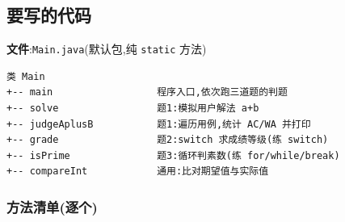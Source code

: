 \documentclass[
  11pt,
]{ctexart}
\begin{document}
\hypertarget{ux8981ux5199ux7684ux4ee3ux7801-1}{%
\subsection{要写的代码}\label{ux8981ux5199ux7684ux4ee3ux7801-1}}

\textbf{文件}:\texttt{Main.java}(默认包,纯 \texttt{static} 方法)

\begin{verbatim}
类 Main
+-- main                  程序入口,依次跑三道题的判题
+-- solve                 题1:模拟用户解法 a+b
+-- judgeAplusB           题1:遍历用例,统计 AC/WA 并打印
+-- grade                 题2:switch 求成绩等级(练 switch)
+-- isPrime               题3:循环判素数(练 for/while/break)
+-- compareInt            通用:比对期望值与实际值
\end{verbatim}

\hypertarget{ux65b9ux6cd5ux6e05ux5355ux9010ux4e2a}{%
\subsubsection{方法清单(逐个)}\label{ux65b9ux6cd5ux6e05ux5355ux9010ux4e2a}}
\end{document}
